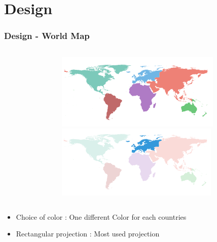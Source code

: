 \documentclass{beamer}
\begin{document}
\section{Design}

\begin{frame}
\frametitle{Design - World Map}

\begin{columns}[T]
  \begin{column}{.7\textwidth}
    \begin{table}
    \end{table}
  \end{column}
  \begin{column}{.25\textwidth}
    \begin{figure}
      \centering
      \includegraphics[scale=0.3]{img/map.png} \\
      \includegraphics[scale=0.3]{img/map_selected.png}
    \end{figure}
  \end{column}
\end{columns}
\begin{itemize}
\item Choice of color : One different Color for each countries 
\item Rectangular projection : Most used projection  
\end{itemize}
\end{frame}
\end{document}

